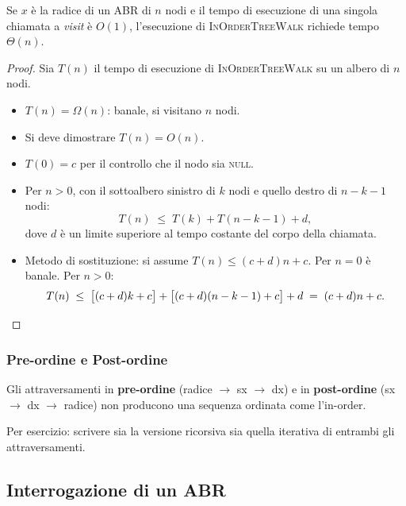 \begin{teorema}
	Se $x$ è la radice di un ABR di $n$ nodi e il tempo di esecuzione di una singola
	chiamata a \emph{visit} è $O(1)$, l'esecuzione di \textsc{InOrderTreeWalk} richiede
	tempo $\Theta(n)$.
\end{teorema}

\begin{proof}
	Sia $T(n)$ il tempo di esecuzione di \textsc{InOrderTreeWalk} su un albero di $n$ nodi.
	\begin{itemize}
		\item $T(n) = \Omega(n)$: banale, si visitano $n$ nodi.
		\item Si deve dimostrare $T(n) = O(n)$.
		\item $T(0) = c$ per il controllo che il nodo sia \textsc{null}.
		\item Per $n > 0$, con il sottoalbero sinistro di $k$ nodi e quello destro
		di $n-k-1$ nodi:
		\[
		T(n) \;\leq\; T(k) + T(n-k-1) + d,
		\]
		dove $d$ è un limite superiore al tempo costante del corpo della chiamata.
		\item Metodo di sostituzione: si assume $T(n) \leq (c+d)n + c$.
		Per $n = 0$ è banale. Per $n > 0$:
		\[
		T(n) \;\leq\; \bigl[(c+d)k + c\bigr] + \bigl[(c+d)(n-k-1) + c\bigr] + d
		\;=\; (c+d)n + c. \qedhere
		\]
	\end{itemize}
\end{proof}

\subsubsection{Pre-ordine e Post-ordine}
\label{subsub:prepost}

Gli attraversamenti in \textbf{pre-ordine} (radice $\to$ sx $\to$ dx) e in
\textbf{post-ordine} (sx $\to$ dx $\to$ radice) non producono una sequenza ordinata
come l'in-order.

\begin{nota}
	Per esercizio: scrivere sia la versione ricorsiva sia quella iterativa di entrambi
	gli attraversamenti.
\end{nota}

\subsection{Interrogazione di un ABR}
\label{sub:abr_query}

